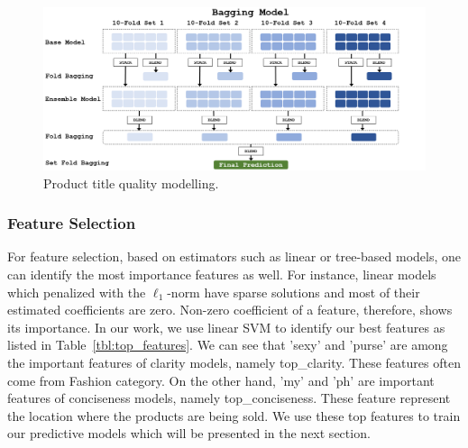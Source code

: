 \documentclass[sigconf]{acmart}
\begin{document}
\begin{figure}
  \centering
    \includegraphics[width=\textwidth]{cikm_cup_model_new}
  \caption{Product title quality modelling.}
  \label{fig:model}
\end{figure}
\subsubsection{Feature Selection}

For feature selection, based on estimators such as linear or tree-based models, one can identify the most importance features as well. For instance, linear models which penalized with the $\mathcal{
\ell}_1$-norm have sparse solutions and most of their estimated coefficients are zero. Non-zero coefficient of a feature, therefore, shows its importance. In our work, we use linear SVM to identify our best features as listed in Table~\ref{tbl:top_features}. We can see that 'sexy' and 'purse' are among the important features of clarity models, namely top\_clarity. These features often come from Fashion category. On the other hand, 'my' and 'ph' are important features of conciseness models, namely top\_conciseness. These feature represent the location where the products are being sold. We use these top features to train our predictive models which will be presented in the next section.

\end{document}

